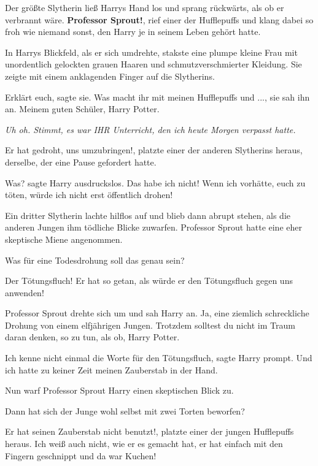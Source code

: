Der größte Slytherin ließ Harrys Hand los und sprang rückwärts, als ob er
verbrannt wäre. \glqq \textbf{Professor Sprout!\grqq{}}, rief einer der
Hufflepuffs und klang dabei so froh wie niemand sonst, den Harry je in seinem
Leben gehört hatte.

In Harrys Blickfeld, als er sich umdrehte, stakste eine plumpe kleine Frau mit
unordentlich gelockten grauen Haaren und schmutzverschmierter Kleidung. Sie
zeigte mit einem anklagenden Finger auf die Slytherins.

\glqq Erklärt euch\grqq{}, sagte sie. \glqq Was macht ihr mit meinen Hufflepuffs
und ...\grqq{}, sie sah ihn an. \glqq Meinem guten Schüler, Harry Potter.\grqq{}

\emph{Uh oh. Stimmt, es war IHR Unterricht, den ich heute Morgen verpasst hatte.
}

\glqq Er hat gedroht, uns umzubringen!\grqq{}, platzte einer der anderen
Slytherins heraus, derselbe, der eine Pause gefordert hatte.

\glqq Was?\grqq{} sagte Harry ausdruckslos. \glqq Das habe ich nicht! Wenn ich
vorhätte, euch zu töten, würde ich nicht erst öffentlich drohen!\grqq{}

Ein dritter Slytherin lachte hilflos auf und blieb dann abrupt stehen, als die
anderen Jungen ihm tödliche Blicke zuwarfen. Professor Sprout hatte eine eher
skeptische Miene angenommen.

\glqq Was für eine Todesdrohung soll das genau sein?\grqq{}

\glqq Der Tötungsfluch! Er hat so getan, als würde er den Tötungsfluch gegen uns
anwenden!\grqq{}

Professor Sprout drehte sich um und sah Harry an. \glqq Ja, eine ziemlich
schreckliche Drohung von einem elfjährigen Jungen. Trotzdem solltest du nicht im
Traum daran denken, so zu tun, als ob, Harry Potter.\grqq{}

\glqq Ich kenne nicht einmal die Worte für den Tötungsfluch\grqq{}, sagte Harry
prompt. \glqq Und ich hatte zu keiner Zeit meinen Zauberstab in der Hand.\grqq{}

Nun warf Professor Sprout Harry einen skeptischen Blick zu.

\glqq Dann hat sich der Junge wohl selbst mit zwei Torten beworfen?\grqq{}

\glqq Er hat seinen Zauberstab nicht benutzt!\grqq{}, platzte einer der jungen
Hufflepuffs heraus. \glqq Ich weiß auch nicht, wie er es gemacht hat, er hat
einfach mit den Fingern geschnippt und da war Kuchen!\grqq{}

